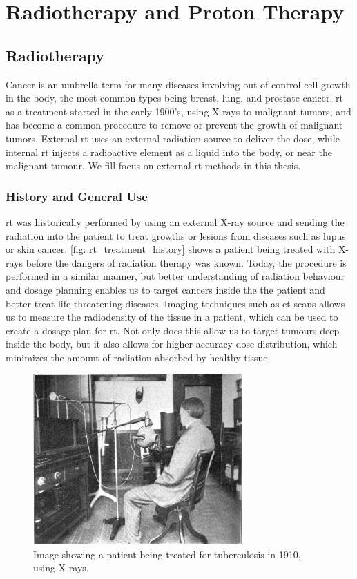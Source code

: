 \documentclass[main.tex]{subfiles}
\begin{document}
\section{Radiotherapy and Proton Therapy}

\subsection{Radiotherapy}

 Cancer is an umbrella term for many diseases involving out of control cell growth in the body, the most common types being breast, lung, and prostate cancer\cite{cancerData}. \gls{rt} as a treatment started in the early 1900's, using X-rays to malignant tumors, and has become a common procedure to remove or prevent the growth of malignant tumors. External \gls{rt} uses an external radiation source to deliver the dose, while internal \gls{rt} injects a radioactive element as a liquid into the body, or near the malignant tumour. We fill focus on external \gls{rt} methods in this thesis.
 
 \subsubsection{History and General Use}
 
 \gls{rt} was historically performed by using an external X-ray source and sending the radiation into the patient to treat growths or lesions from diseases such as lupus or skin cancer. \autoref{fig: rt_treatment_history} shows a patient being treated with X-rays before the dangers of radiation therapy was known. Today, the procedure is performed in a similar manner, but better understanding of radiation behaviour and dosage planning enables us to target cancers inside the the patient and better treat life threatening diseases. Imaging techniques such as \gls{ct}-scans allows us to measure the radiodensity of the tissue in a patient, which can be used to create a dosage plan for \gls{rt}. Not only does this allow us to target tumours deep inside the body, but it also allows for higher accuracy dose distribution, which minimizes the amount of radiation absorbed by healthy tissue.
 
  \begin{figure}[!htpb]
    \centering
    \includegraphics[width=8cm ]{images/x_ray_treatment_history.jpg}
    \caption{Image showing a patient being treated for tuberculosis in 1910, using X-rays.\cite{rt_history}}
    \label{fig: rt_treatment_history}
\end{figure}
 
\end{document}
